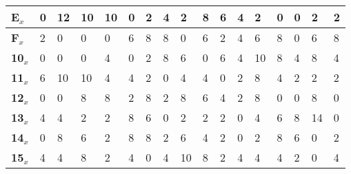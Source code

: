 \begin{longtable}[c]{|l|l|l|l|l|l|l|l|l|l|l|l|l|l|l|l|l|}
\textbf{E$_x$}  & 0              & 12             & 10             & 10             & 0              & 2              & 4              & 2              & 8              & 6              & 4              & 2              & 0              & 0              & 2              & 2              \\ \hline
\textbf{F$_x$}  & 2              & 0              & 0              & 0              & 6              & 8              & 8              & 0              & 6              & 2              & 4              & 6              & 8              & 0              & 6              & 8              \\ \hline
\textbf{10$_x$} & 0              & 0              & 0              & 4              & 0              & 2              & 8              & 6              & 0              & 6              & 4              & 10             & 8              & 4              & 8              & 4              \\ \hline
\textbf{11$_x$} & 6              & 10             & 10             & 4              & 4              & 2              & 0              & 4              & 4              & 0              & 2              & 8              & 4              & 2              & 2              & 2              \\ \hline
\textbf{12$_x$} & 0              & 0              & 8              & 8              & 2              & 8              & 2              & 8              & 6              & 4              & 2              & 8              & 0              & 0              & 8              & 0              \\ \hline
\textbf{13$_x$} & 4              & 4              & 2              & 2              & 8              & 6              & 0              & 2              & 2              & 2              & 0              & 4              & 6              & 8              & 14             & 0              \\ \hline
\textbf{14$_x$} & 0              & 8              & 6              & 2              & 8              & 8              & 2              & 6              & 4              & 2              & 0              & 2              & 8              & 6              & 0              & 2              \\ \hline
\textbf{15$_x$} & 4              & 4              & 8              & 2              & 4              & 0              & 4              & 10             & 8              & 2              & 4              & 4              & 4              & 2              & 0              & 4              \\ \hline

\end{longtable}

